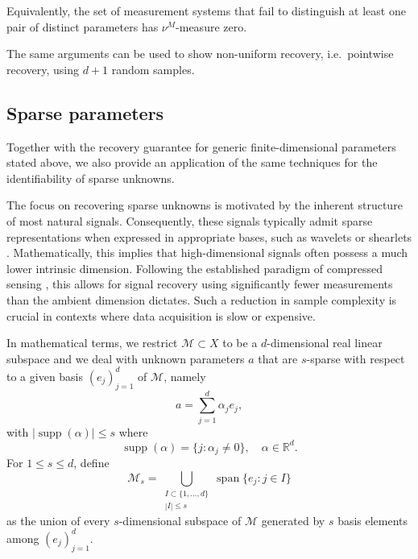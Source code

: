 \documentclass[11pt,oneside]{amsart}
\theoremstyle{plain}
\newtheorem{corollary}[theorem]{Corollary}
\theoremstyle{definition}
\theoremstyle{remark}
\newtheorem{remark}[theorem]{Remark}
\newcommand{\RR}{\mathbb{R}}
\newcommand{\CC}{\mathbb{C}}
\newcommand{\calM}{\mathcal{M}}
\begin{document}
Equivalently, the set of measurement systems that fail to distinguish at least one pair of distinct parameters has $\nu^M$-measure zero. 

The same arguments can be used to show non-uniform recovery, i.e.\ pointwise recovery, using $d+1$ random samples.



\subsection{Sparse parameters}\label{sec:sparse}
Together with the recovery guarantee for generic finite-dimensional parameters stated above, we also provide an application of the same techniques for the identifiability of sparse unknowns.

The focus on recovering sparse unknowns is motivated by the inherent structure of most natural signals. Consequently, these signals typically admit sparse representations \cite{zhang2015survey} when expressed in appropriate bases, such as wavelets \cite{mallat1999wavelet} or shearlets \cite{kutyniok2012introduction}. Mathematically, this implies that high-dimensional signals often possess a much lower intrinsic dimension. Following the established paradigm of compressed sensing \cite{Foucart2013-od}, this allows for signal recovery using significantly fewer measurements than the ambient dimension dictates. Such a reduction in sample complexity is crucial in contexts where data acquisition is slow or expensive.

In mathematical terms, we restrict $\mathcal M\subset X$ to be a $d$-dimensional real linear subspace and we deal with unknown parameters $a$ that are $s$-sparse with respect to a given basis $(e_j)_{j=1}^d$ of $\calM$, namely
\[
    a = \sum_{j=1}^d \alpha_j e_j,
\]
with $|\operatorname{supp}(\alpha)|\le s$ where 
\[
    \operatorname{supp}(\alpha)=\{j:\alpha_j\neq0\},\quad\alpha\in\RR^d.
\]
For $1\leq s\leq d$, define
\begin{equation}\label{eq:sparse-set}
    \calM_s
    =\bigcup_{\substack{I\subset\{1,\ldots,d\}\\ |I|\leq s}}
      \operatorname{span}\{e_j:j\in I\}
\end{equation}
as the union of every $s$-dimensional subspace of $\calM$ generated by $s$ basis elements among $(e_j)_{j=1}^d$. 
\end{document}
